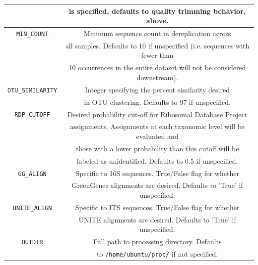 \documentclass[11pt, oneside]{article}   	%
\begin{document}
\begin{center}
\begin{longtable}{| c | c |}
		& is specified, defaults to quality trimming behavior, above. \\
		\hline
        {\tt MIN\_COUNT} & Minimum sequence count in dereplication across \\
        & all samples.  Defaults to 10 if unspecified (i.e. sequences with fewer than  \\
        & 10 occurrences in the entire dataset will not be considered downstream). \\
        \hline
        {\tt OTU\_SIMILARITY} & Integer specifying the percent similarity desired \\
         &  in OTU clustering.  Defaults to 97 if unspecified. \\
	\hline
	{\tt RDP\_CUTOFF} & Desired probability cut-off for Ribosomal Database Project \\
	& assignments.  Assignments at each taxonomic level will be evaluated and \\
	& those with a lower probability than this cutoff will be \\
	& labeled as unidentified. Defaults to 0.5 if unspecified. \\
	\hline
	{\tt GG\_ALIGN} & Specific to 16S sequences.  True/False flag for whether \\
	& GreenGenes alignments are desired.  Defaults to 'True' if unspecified. \\
	\hline
	{\tt UNITE\_ALIGN} & Specific to ITS sequences.  True/False flag for whether \\
	& UNITE alignments are desired.  Defaults to 'True' if unspecified. \\
	\hline
	{\tt OUTDIR} & Full path to processing directory. Defaults \\
	& to {\tt /home/ubuntu/proc/} if not specified. \\
	\hline
\end{longtable}
\end{center}
\end{document}
